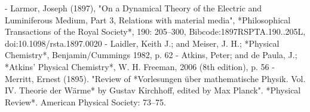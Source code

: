 \begin{enumerate}
- Larmor, Joseph (1897), "On a Dynamical Theory of the Electric and Luminiferous Medium, Part 3, Relations with material media", *Philosophical Transactions of the Royal Society*, 190: 205–300, Bibcode:1897RSPTA.190..205L, doi:10.1098/rsta.1897.0020  
- Laidler, Keith J.; and Meiser, J. H.; *Physical Chemistry*, Benjamin/Cummings 1982, p. 62  
- Atkins, Peter; and de Paula, J.; *Atkins' Physical Chemistry*, W. H. Freeman, 2006 (8th edition), p. 56  
- Merritt, Ernest (1895). "Review of *Vorlesungen über mathematische Physik. Vol. IV. Theorie der Wärme* by Gustav Kirchhoff, edited by Max Planck". *Physical Review*. American Physical Society: 73–75.
\end{enumerate}